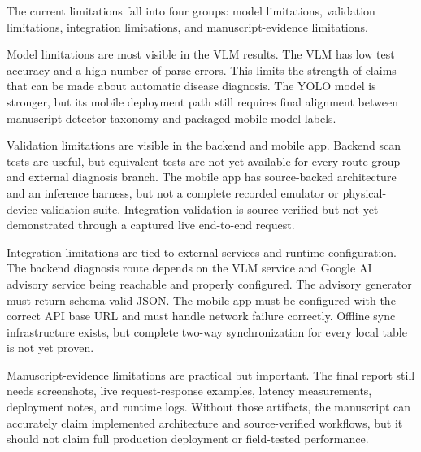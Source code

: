 
The current limitations fall into four groups: model limitations, validation limitations,
integration limitations, and manuscript-evidence limitations.

Model limitations are most visible in the VLM results. The VLM has low test accuracy and a high
number of parse errors. This limits the strength of claims that can be made about automatic
disease diagnosis. The YOLO model is stronger, but its mobile deployment path still requires final
alignment between manuscript detector taxonomy and packaged mobile model labels.

Validation limitations are visible in the backend and mobile app. Backend scan tests are useful,
but equivalent tests are not yet available for every route group and external diagnosis branch.
The mobile app has source-backed architecture and an inference harness, but not a complete
recorded emulator or physical-device validation suite. Integration validation is source-verified
but not yet demonstrated through a captured live end-to-end request.

Integration limitations are tied to external services and runtime configuration. The backend
diagnosis route depends on the VLM service and Google AI advisory service being reachable and
properly configured. The advisory generator must return schema-valid JSON. The mobile app must be
configured with the correct API base URL and must handle network failure correctly. Offline sync
infrastructure exists, but complete two-way synchronization for every local table is not yet
proven.

Manuscript-evidence limitations are practical but important. The final report still needs
screenshots, live request-response examples, latency measurements, deployment notes, and runtime
logs. Without those artifacts, the manuscript can accurately claim implemented architecture and
source-verified workflows, but it should not claim full production deployment or field-tested
performance.

